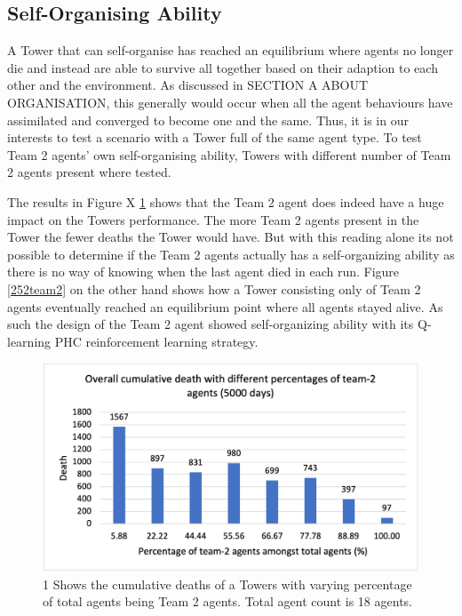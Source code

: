 \subsection{Self-Organising Ability}
A Tower that can self-organise has reached an equilibrium where agents no longer die and instead are able to survive all together based on their adaption to each other and the environment. As discussed in SECTION A ABOUT ORGANISATION, this generally would occur when all the agent behaviours have assimilated and converged to become one and the same. Thus, it is in our interests to test a scenario with a Tower full of the same agent type. To test Team 2 agents’ own self-organising ability, Towers with different number of Team 2 agents present where tested.

The results in Figure X \ref{251team2} shows that the Team 2 agent does indeed have a huge impact on the Towers performance. The more Team 2 agents present in the Tower the fewer deaths the Tower would have. But with this reading alone its not possible to determine if the Team 2 agents actually has a self-organizing ability as there is no way of knowing when the last agent died in each run. Figure \ref{252team2} on the other hand shows how a Tower consisting only of Team 2 agents eventually reached an equilibrium point where all agents stayed alive. As such the design of the Team 2 agent showed self-organizing ability with its Q-learning PHC reinforcement learning strategy.

\begin{figure}
\centering
\includegraphics{004_team_2_agent_design/251team2}
\caption{1 Shows the cumulative deaths of a Towers with varying percentage of total agents being Team 2 agents. Total agent count is 18 agents.}
\label{251team2}
\end{figure}

